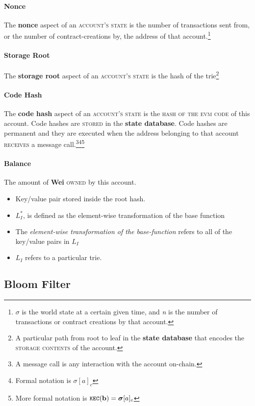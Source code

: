\documentclass[10pt,a4paper,leqno,bibliography=totoc]{scrartcl}
\newenvironment{alphafootnotes}
{\par\edef\savedfootnotenumber{\number\value{footnote}}
\renewcommand{\thefootnote}{\alph{footnote}}
\setcounter{footnote}{0}}
{\par\setcounter{footnote}{\savedfootnotenumber}}
\begin{document}
\begin{alphafootnotes}
\begin{multicols*}{2}
    				\paragraph{Nonce} 
					The \textbf{nonce} aspect of an \textsc{account's state} is the number of transactions sent from, or the number of contract-creations by, the address of that account.\footnote{$\sigma$ is the world state at a certain given time, and \textit{n} is the number of transactions or contract creations by that account.}
    				\paragraph{Storage Root}
    					The \textbf{storage root} aspect of an \textsc{account's state} is the hash of the trie\footnote{A particular path from root to leaf in the \textbf{\gls{state database}} that encodes the \textsc{storage contents} of the account.}
    				\paragraph{Code Hash}
    					The \textbf{code hash} aspect of an \textsc{account's state} is the \textsc{hash of the evm code} of this account. Code hashes are \textsc{stored} in the \textbf{\gls{state database}}. Code hashes are permanent and they are executed when the address belonging to that account \textsc{receives} a message call.\footnote{A message call is any interaction with the account on-chain.}\footnote{Formal notation is $\sigma[a]_c$}\footnote{More formal notation is $\texttt{\small KEC}(\mathbf{b}) = \boldsymbol{\sigma}[a]_c$}
    				\paragraph{Balance}
    					The amount of \textbf{Wei} \textsc{owned} by this account. 
					    \begin{itemize}
				            \item Key/value pair stored inside the root hash. 
					    \item $L_I^*$, is defined as the element-wise transformation of the base function
					    \item The \textsl{element-wise transformation of the base-function} refers to all of the key/value pairs in \textit{$L_I$}
					    \item $L_I$ refers to a particular \gls{trie}.
					    \end{itemize}

   		\subsection{Bloom Filter}

\end{multicols*}
\end{alphafootnotes}
\end{document}
